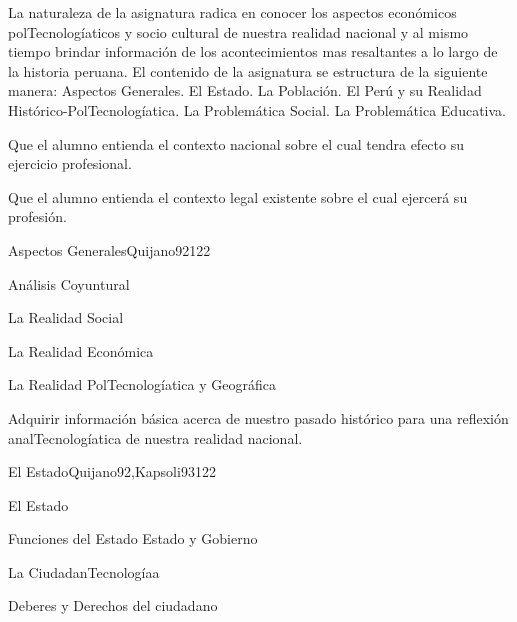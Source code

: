\begin{syllabus}


\begin{justification}
La naturaleza de la asignatura radica en conocer los aspectos económicos polTecnologíaticos y socio cultural de nuestra realidad nacional y al mismo tiempo brindar información de los acontecimientos mas resaltantes a lo largo de la historia peruana. El contenido de la asignatura se estructura de la siguiente manera: Aspectos Generales. El Estado. La Población. El Perú y su Realidad Histórico-PolTecnologíatica. La Problemática Social. La Problemática Educativa.
\end{justification}

\begin{goals}
\item Que el alumno entienda el contexto nacional sobre el cual tendra efecto su ejercicio profesional.
\item Que el alumno entienda el contexto legal existente sobre el cual ejercerá su profesión.
\end{goals}

\begin{outcomes}
\end{outcomes}

\begin{unit}{Aspectos Generales}{Quijano92}{12}{2}
\begin{topics}
	\item Análisis Coyuntural
  	\item La Realidad Social
  	\item La Realidad Económica
  	\item La Realidad PolTecnologíatica y Geográfica
\end{topics}

\begin{unitgoals}
      \item  Adquirir información básica acerca de nuestro pasado histórico para una reflexión analTecnologíatica de nuestra realidad nacional.
   \end{unitgoals}
\end{unit}

\begin{unit}{El Estado}{Quijano92,Kapsoli93}{12}{2}
\begin{topics}
	\item El Estado
	\item Funciones del Estado Estado y Gobierno
	\item La CiudadanTecnologíaa
	\item Deberes y Derechos del ciudadano
\end{topics}


\end{unit}
\end{syllabus}
